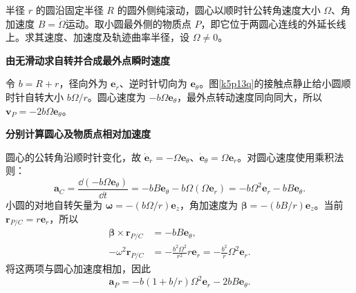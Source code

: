 \begin{question}\begin{example}[圆外滚动时轮缘轨迹的曲率]\label{k5p13}
半径 $r$ 的圆沿固定半径 $R$ 的圆外侧纯滚动，圆心以顺时针公转角速度大小 $\Omega$、角加速度 $B=\dot\Omega$运动。取小圆最外侧的物质点 $P$，即它位于两圆心连线的外延长线上。求其速度、加速度及轨迹曲率半径，设 $\Omega\ne0$。\end{example}
\end{question}
\begin{solution}\textbf{由无滑动求自转并合成最外点瞬时速度}\par\nobreak
令 $b=R+r$，径向外为 $\bm e_r$、逆时针切向为 $\bm e_\theta$。图\ref{k5p13q}的接触点静止给小圆顺时针自转大小 $b\Omega/r$。圆心速度为 $-b\Omega\bm e_\theta$，最外点转动速度同向同大，所以 $\boxed{\bm v_P=-2b\Omega\bm e_\theta}$。



\par\medskip{}\noindent\textbf{分别计算圆心及物质点相对加速度}\par\nobreak
圆心的公转角沿顺时针变化，故 $\dot{\bm e}_r=-\Omega\bm e_\theta$、$\dot{\bm e}_\theta=\Omega\bm e_r$。对圆心速度使用乘积法则：
\[
 \bm a_C=\frac{\dd(-b\Omega\bm e_\theta)}{\dd t}
 =-bB\bm e_\theta-b\Omega(\Omega\bm e_r)
 =-b\Omega^2\bm e_r-bB\bm e_\theta.
\]
小圆的对地自转矢量为 $\bm\omega=-(b\Omega/r)\bm e_z$，角加速度为 $\bm\beta=-(bB/r)\bm e_z$。当前 $\bm r_{P/C}=r\bm e_r$，所以
\begin{align*}
 \bm\beta\times\bm r_{P/C}&=-bB\bm e_\theta,\\
 -\omega^2\bm r_{P/C}&=-\frac{b^2\Omega^2}{r^2}r\bm e_r
 =-\frac{b^2}{r}\Omega^2\bm e_r.
\end{align*}
将这两项与圆心加速度相加，因此
\[\boxed{\bm a_P=-b(1+b/r)\Omega^2\bm e_r-2bB\bm e_\theta}.\]



\end{solution}
